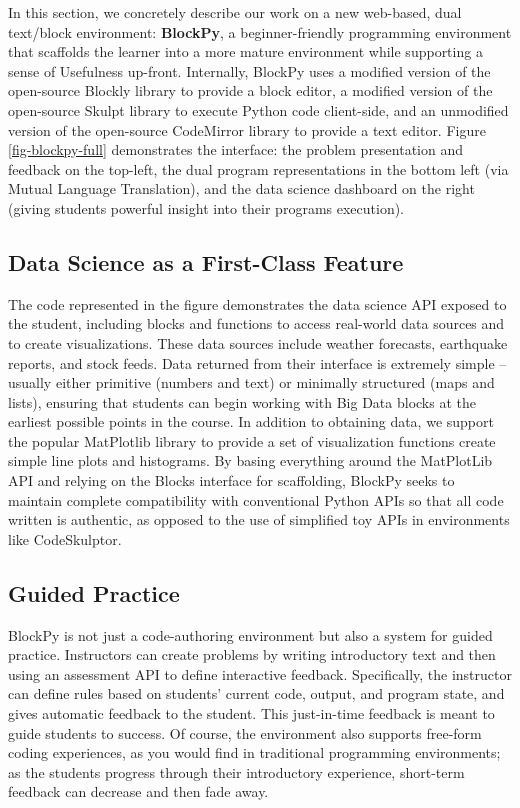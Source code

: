 \documentclass[conference]{IEEEtran}
\begin{document}
In this section, we concretely describe our work on a new web-based, dual text/block environment:
\textbf{BlockPy}, a beginner-friendly programming environment that scaffolds the learner into a more mature environment while supporting a sense of Usefulness up-front.
Internally, BlockPy uses a modified version of the open-source Blockly library to provide a block editor, a modified version of the open-source Skulpt library to execute Python code client-side, and an unmodified version of the open-source CodeMirror library to provide a text editor.
Figure \ref{fig-blockpy-full} demonstrates the interface: the problem presentation and feedback on the top-left, the dual program representations in the bottom left (via Mutual Language Translation), and the data science dashboard on the right (giving students powerful insight into their programs execution).

\subsection{Data Science as a First-Class Feature}

The code represented in the figure demonstrates the data science API exposed to the student, including blocks and functions to access real-world data sources and to create visualizations.
These data sources include weather forecasts, earthquake reports, and stock feeds.
Data returned from their interface is extremely simple -- usually either primitive (numbers and text) or minimally structured (maps and lists), ensuring that students can begin working with Big Data blocks at the earliest possible points in the course.
In addition to obtaining data, we support the popular MatPlotlib library to provide a set of visualization functions create simple line plots and histograms.
By basing everything around the MatPlotLib API and relying on the Blocks interface for scaffolding, BlockPy seeks to maintain complete compatibility with conventional Python APIs so that all code written is authentic, as opposed to the use of simplified toy APIs in environments like CodeSkulptor.

\subsection{Guided Practice}

BlockPy is not just a code-authoring environment but also a system for guided practice.
Instructors can create problems by writing introductory text and then using an assessment API to define interactive feedback.
Specifically, the instructor can define rules based on students' current code, output, and program state, and gives automatic feedback to the student.
This just-in-time feedback is meant to guide students to success.
Of course, the environment also supports free-form coding experiences, as you would find in traditional programming environments; as the students progress through their introductory experience, short-term feedback can decrease and then fade away.
\end{document}
